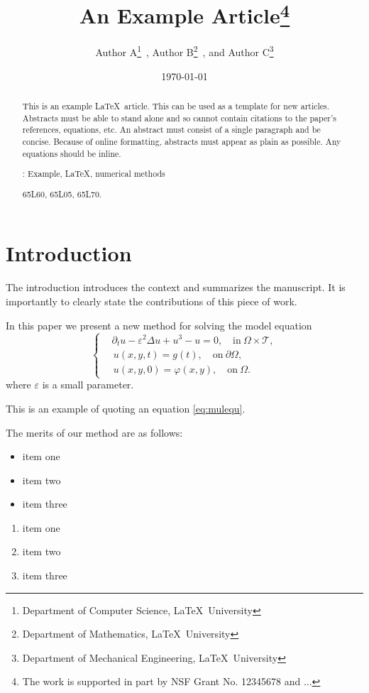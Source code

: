 \documentclass[10pt,reqno,final]{article}
\title{An Example Article\thanks{The work is supported in part by NSF Grant No. 12345678 and ...}}
\author{
  Author A\thanks{Department of Computer Science, \LaTeX\ University}~,
  Author B\thanks{Department of Mathematics, \LaTeX\ University}~,
  and
  Author C\thanks{Department of Mechanical Engineering, \LaTeX\ University}
}
\date{\today}
\theoremstyle{plain}
\theoremstyle{definition}
\theoremstyle{remark}
\numberwithin{equation}{section}
\numberwithin{figure}{section}
\numberwithin{table}{section}
\begin{document}
\maketitle

\begin{abstract}
  This is an example \LaTeX\ article. This can be used as a
  template for new articles.  Abstracts must be able to stand alone
  and so cannot contain citations to the paper's references,
  equations, etc.  An abstract must consist of a single paragraph and
  be concise. Because of online formatting, abstracts must appear as
  plain as possible. Any equations should be inline.

  \medskip
  : Example, \LaTeX, numerical methods

  \medskip
   65L60, 65L05, 65L70.
\end{abstract}


\section{Introduction}
The introduction introduces the context and summarizes the
manuscript. It is importantly to clearly state the contributions of
this piece of work.

In this paper we present a new method for solving the model equation
\begin{equation}\label{eq:mulequ}
\left\{\begin{aligned}
  & \partial_{t} u-\varepsilon^{2} \Delta u+u^{3}-u=0, \quad \text{in} ~\Omega\times\mathcal{T}, \\
  &\, u(x,y,t) = g(t), \quad \text{on} ~ \partial \Omega, \\
  &\, u(x,y,0)=\varphi(x, y), \quad \text{on} ~\Omega.
\end{aligned}\right.
\end{equation}
where $\varepsilon$ is a small parameter.

This is an example of quoting an equation \eqref{eq:mulequ}.

The merits of our method are as follows:
\begin{itemize}
  \item item one
  \item item two
  \item item three
\end{itemize}
\begin{enumerate}
  \item item one
  \item item two
  \item item three
\end{enumerate}
\end{document}
